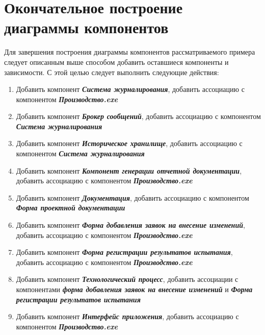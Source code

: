 \documentclass[a4paper,12pt]{report}
\begin{document}
\section*{Окончательное построение диаграммы компонентов }
Для завершения построения диаграммы компонентов рассматриваемого примера следует описанным выше способом добавить оставшиеся компоненты и зависимости. С этой целью следует выполнить следующие действия:
\begin{enumerate}
	\item Добавить компонент \textit{\textbf{Система журналирования}}, добавить ассоциацию с компонентом \textit{\textbf{Производство.exe}}
	
	\item Добавить компонент \textit{\textbf{Брокер сообщений}}, добавить ассоциацию с компонентом \textit{\textbf{Система журналирования}}
	
	\item Добавить компонент \textit{\textbf{Историческое хранилище}}, добавить ассоциацию с компонентом \textit{\textbf{Система журналирования}}
	
	\item Добавить компонент \textit{\textbf{Компонент генерации отчетной документации}}, добавить ассоциацию с компонентом \textit{\textbf{Производство.exe}}
	
	\item Добавить компонент \textit{\textbf{Документация}}, добавить ассоциацию с компонентом \textit{\textbf{Форма проектной документации}}
	
	\item Добавить компонент \textit{\textbf{Форма добавления заявок на внесение изменений}}, добавить ассоциацию с компонентом \textit{\textbf{Производство.exe}}
	
	\item Добавить компонент \textit{\textbf{Форма регистрации результатов испытания}}, добавить ассоциацию с компонентом \textit{\textbf{Производство.exe}}
	
	\item Добавить компонент \textit{\textbf{Технологический процесс}}, добавить ассоциации с компонентами \textit{\textbf{форма добавления заявок на внесение изменений}} и \textit{\textbf{Форма регистрации результатов испытания}}
	
	\item Добавить компонент \textit{\textbf{Интерфейс приложения}}, добавить ассоциацию с компонентом \textit{\textbf{Производство.exe}}
\end{enumerate}
\end{document}
